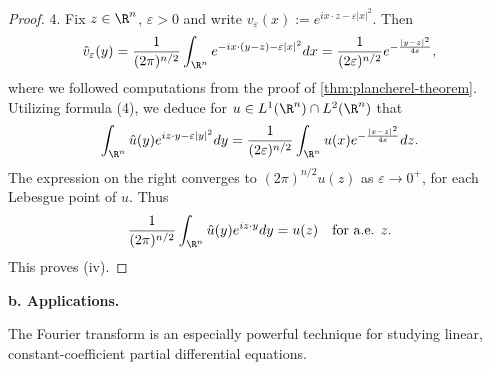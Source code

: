 \begin{proof}
4. Fix $z \in \R^n$, $\varepsilon > 0$ and write $v_\varepsilon(x) := e^{ix \cdot z - \varepsilon|x|^2}$. Then
$$\hat{v}_\varepsilon(y) = \frac{1}{(2\pi)^{n/2}} \int_{\R^n} e^{-ix \cdot (y-z) - \varepsilon|x|^2} dx = \frac{1}{(2\varepsilon)^{n/2}} e^{-\frac{|y-z|^2}{4\varepsilon}},$$
where we followed computations from the proof of \cref{thm:plancherel-theorem}. Utilizing formula (4), we deduce for $u \in L^1(\R^n) \cap L^2(\R^n)$ that
$$\int_{\R^n} \hat{u}(y)e^{iz \cdot y - \varepsilon|y|^2} dy = \frac{1}{(2\varepsilon)^{n/2}} \int_{\R^n} u(x)e^{-\frac{|x-z|^2}{4\varepsilon}} dz.$$
The expression on the right converges to $(2\pi)^{n/2}u(z)$ as $\varepsilon \to 0^+$, for each Lebesgue point of $u$. Thus
$$\frac{1}{(2\pi)^{n/2}} \int_{\R^n} \hat{u}(y)e^{iz \cdot y} dy = u(z) \quad \text{for a.e. } z.$$
This proves (iv).
\end{proof}

\textbf{b. Applications.}

The Fourier transform is an especially powerful technique for studying linear, constant-coefficient partial differential equations.


